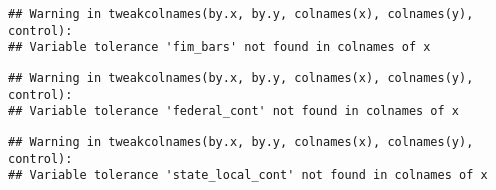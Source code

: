 \documentclass[
]{article}
\begin{document}
\begin{verbatim}
## Warning in tweakcolnames(by.x, by.y, colnames(x), colnames(y), control):
## Variable tolerance 'fim_bars' not found in colnames of x
\end{verbatim}

\begin{verbatim}
## Warning in tweakcolnames(by.x, by.y, colnames(x), colnames(y), control):
## Variable tolerance 'federal_cont' not found in colnames of x
\end{verbatim}

\begin{verbatim}
## Warning in tweakcolnames(by.x, by.y, colnames(x), colnames(y), control):
## Variable tolerance 'state_local_cont' not found in colnames of x
\end{verbatim}
\end{document}
